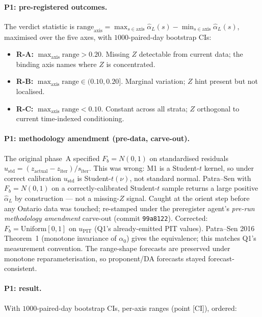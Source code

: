 \documentclass[11pt]{article}
\theoremstyle{definition}
\theoremstyle{plain}
\begin{document}
\paragraph{P1: pre-registered outcomes.}
The verdict statistic is
\(\mathrm{range}_{\mathrm{axis}} = \max_{s\in\mathrm{axis}}\hat\alpha_L(s) -
\min_{s\in\mathrm{axis}}\hat\alpha_L(s)\), maximised over the five
axes, with $1000$-paired-day bootstrap CIs:
\begin{itemize}[leftmargin=2em]
\item \textbf{R-A:} $\max_{\mathrm{axis}}\mathrm{range} > 0.20$. Missing
$Z$ detectable from current data; the binding axis names where
$Z$ is concentrated.
\item \textbf{R-B:} $\max_{\mathrm{axis}}\mathrm{range} \in (0.10, 0.20]$.
Marginal variation; $Z$ hint present but not localised.
\item \textbf{R-C:} $\max_{\mathrm{axis}}\mathrm{range} < 0.10$.
Constant across all strata; $Z$ orthogonal to current
time-indexed conditioning.
\end{itemize}

\paragraph{P1: methodology amendment (pre-data, carve-out).}
The original phase~A specified $F_b = N(0, 1)$ on standardised
residuals $u_{\mathrm{std}} = (z_{\mathrm{actual}} -
z_{\mathrm{iter}})/s_{\mathrm{iter}}$. This was wrong: M1 is a
Student-$t$ kernel, so under correct calibration $u_{\mathrm{std}}$
is Student-$t(\nu)$, not standard normal. Patra--Sen with
$F_b = N(0, 1)$ on a correctly-calibrated Student-$t$ sample returns
a large positive $\hat\alpha_L$ by construction --- not a missing-$Z$
signal. Caught at the orient step before any Ontario data was
touched; re-stamped under the preregister agent's
\emph{pre-run methodology amendment} carve-out (commit
\texttt{99a8122}). Corrected: $F_b = \mathrm{Uniform}[0,1]$ on
$u_{\mathrm{PIT}}$ (Q1's already-emitted PIT values). Patra--Sen
2016 Theorem~1 (monotone invariance of $\alpha_0$) gives the
equivalence; this matches Q1's measurement convention. The
range-shape forecasts are preserved under monotone reparameterisation,
so proponent/DA forecasts stayed forecast-consistent.

\paragraph{P1: result.}
With $1000$-paired-day bootstrap CIs, per-axis ranges (point [CI]),
ordered:
\end{document}
